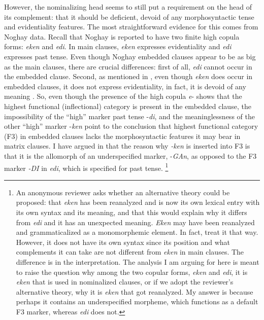 \documentclass[output=paper]{langsci/langscibook}
\begin{document}
However, the nominalizing head seems to still put a requirement on the head of its complement: 
that it should be deficient, devoid of any morphosyntactic tense and evidentiality features. 
The most straightforward evidence for this comes from Noghay data. 
Recall that Noghay is reported to have two finite high copula forms: \textit{eken} and \textit{edi}. 
In main clauses, \textit{eken} expresses evidentiality and \textit{edi} expresses past tense. 
Even though Noghay embedded clauses appear to be as big as the main clauses, there are crucial differences: 
first of all, \textit{edi} cannot occur in the embedded clause. 
Second, as mentioned in , even though \textit{eken} does occur in embedded clauses, it does not express evidentiality, in fact, it is devoid of any meaning \citep{Karakoc2007}. 
So, even though the presence of the high copula \textit{e}{}- shows that the highest functional (inflectional) category is present in the embedded clause, the impossibility of the ``high'' marker past tense -\textit{di}, and the meaninglessness of the other ``high'' marker -\textit{ken} point to the conclusion that highest functional category (F3) in embedded clauses lacks the morphosyntactic features it may bear in matrix clauses. 
I have argued in \citet{Kelepir2015} that the reason why \textit{{}-ken} is inserted into F3 is that it is the allomorph of an underspecified marker, -\textit{GAn}, as opposed to the F3 marker \textit{{}-DI} in \textit{edi}, which is specified for past tense.%
    \footnote{
        An anonymous reviewer asks whether an alternative theory could be proposed: 
        that \textit{eken} has been reanalyzed and is now its own lexical entry with its own syntax and its meaning, and that this would explain why it differs from \textit{edi} and it has an unexpected meaning. 
        \textit{Eken} may have been reanalyzed and grammaticalized as a monomorphemic element. 
        In fact, \citet{Karakoc2001,Karakoc2007} treat it that way. 
        However, it does not have its own syntax since its position and what complements it can take are not different from \textit{eken} in main clauses. 
        The difference is in the interpretation. 
        The analysis I am arguing for here is meant to raise the question why among the two copular forms, \textit{eken} and \textit{edi}, it is \textit{eken} that is used in nominalized clauses, or if we adopt the reviewer's alternative theory, why it is \textit{eken} that got reanalyzed. 
        My answer is because perhaps it contains an underspecified morpheme, which functions as a default F3 marker, whereas \textit{edi} does not.
    } 
\end{document}
